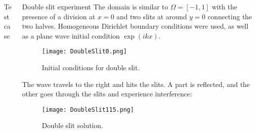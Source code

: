 \documentclass[final]{beamer}
\newlength{\onecolwid}
\newlength{\twocolwid}
\begin{document}
\begin{frame}[t]
\begin{columns}[t]
\begin{column}{\twocolwid}
\begin{columns}[t,totalwidth=\twocolwid]
\begin{column}{\onecolwid}
\begin{block}{Test case}
\end{block}


\end{column} %

\begin{column}{\onecolwid}\vspace{-.6in} %


\begin{block}{Double slit experiment}
The domain is similar to $\Omega=[-1,1]$ with the presence of a division at $x=0$ and two slits at around $y=0$ connecting the two halves. Homogeneous Dirichlet boundary conditions were used, as well as a plane wave initial condition $\exp\left(ikx\right)$.
\begin{figure}[H]
\texttt{[image: DoubleSlit0.png]}
\caption{Initial conditions for double slit.}
\end{figure}
The wave travels to the right and hits the slits. A part is reflected, and the other goes through the slits and experience interference:
\begin{figure}[H]
	\texttt{[image: DoubleSlit115.png]}
	\caption{Double slit solution.}
\end{figure}
\end{block}


\end{column} %

\end{columns} %





\end{column}
\end{columns}
\end{frame}
\end{document}
